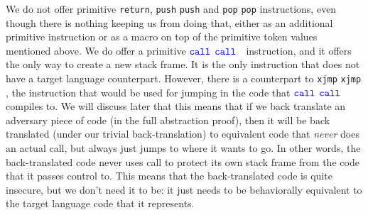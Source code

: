 \documentclass[a3paper]{article}
\newcommand\lau[1]{{\color{purple} \sf \footnotesize {LS: #1}}\\}
\newcommand\dominique[1]{{\color{purple} \sf \footnotesize {DD: #1}}\\}
\newcommand{\sourcecolor}{\color{blue}}
\newcommand{\src}[1]{{\sourcecolor #1}}
\newcommand{\zinstr}[1]{\texttt{#1}}
\newcommand{\oneinstr}[2]{
  \ifthenelse{\equal{#2}{}}
  {\zinstr{#1}}
  {\zinstr{#1} \; #2}
}
\newcommand{\twoinstr}[3]{
  \ifthenelse{\equal{#2#3}{}}
  {\zinstr{#1}}
  {\zinstr{#1} \; #2 \; #3}
}
\newcommand{\threeinstr}[4]{
  \ifthenelse{\equal{#2#3#4}{}}
  {\zinstr{#1}}
  {\zinstr{#1} \; #2 \; #3 \; #4}
}
\newcommand{\sreturn}{\zinstr{\src{return}}}
\newcommand{\spush}[1]{\oneinstr{\src{push}}{#1}}
\newcommand{\spop}[1]{\oneinstr{\src{pop}}{#1}}
\newcommand{\sxjmp}[2]{\twoinstr{\src{xjmp}}{#1}{#2}}
\newcommand{\scall}[3][]{  
\ifthenelse{\equal{#2#3}{}}
  {\ensuremath{\zinstr{\src{call}}_{#1}}}
  {\ensuremath{\zinstr{\src{call}}_{#1} \; #2 \; #3}}
}
\newcommand{\ssplice}[3]{\threeinstr{\src{splice}}{#1}{#2}{#3}}
\newcommand{\retptrd}{\mathrm{ret\text{-}ptr\text{-}data}}
\newcommand{\retptrc}{\mathrm{ret\text{-}ptr\text{-}code}}
\begin{document}
We do not offer primitive \sreturn{}, \spush{} and \spop{} instructions, even though there is nothing keeping us from doing that, either as an additional primitive instruction or as a macro on top of the primitive token values mentioned above.
We do offer a primitive \scall{}{} instruction, and it offers the only way to create a new stack frame.
It is the only instruction that does not have a target language counterpart.
However, there is a counterpart to \sxjmp{}{}, the instruction that would be used for jumping in the code that \scall{}{} compiles to.
We will discuss later that this means that if we back translate an adversary piece of code (in the full abstraction proof), then it will be back translated (under our trivial back-translation) to equivalent code that \emph{never} does an actual call, but always just jumps to where it wants to go.
In other words, the back-translated code never uses call to protect its own stack frame from the code that it passes control to.
This means that the back-translated code is quite insecure, but we don't need it to be: it just needs to be behaviorally equivalent to the target language code that it represents.

\end{document}
